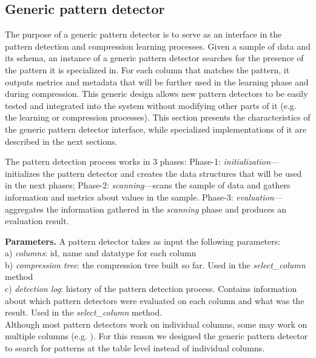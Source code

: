 \subsection{Generic pattern detector}
\label{subsec:genericpd}





% 

The purpose of a generic pattern detector is to serve as an interface in the pattern detection and compression learning processes. Given a sample of data and its schema, an instance of a generic pattern detector searches for the presence of the pattern it is specialized in.  For each column that matches the pattern, it outputs metrics and metadata that will be further used in the learning phase and during compression. This generic design allows new pattern detectors to be easily tested and integrated into the system without modifying other parts of it (e.g. the learning or compression processes). This section presents the characteristics of the generic pattern detector interface, while specialized implementations of it are described in the next sections.

The pattern detection process works in 3 phases: Phase-1: \textit{initialization}---initializes the pattern detector and creates the data structures that will be used in the next phases; Phase-2: \textit{scanning}---scans the sample of data and gathers information and metrics about values in the sample. Phase-3: \textit{evaluation}---aggregates the information gathered in the \textit{scanning} phase and produces an evaluation result.

\textbf{Parameters.} A pattern detector takes as input the following parameters:\\
a) \textit{columns}: id, name and datatype for each column\\
b) \textit{compression tree}: the compression tree built so far. Used in the \textit{select\_column} method\\
c) \textit{detection log}: history of the pattern detection process. Contains information about which pattern detectors were evaluated on each column and what was the result. Used in the \textit{select\_column} method.\\
Although most pattern detectors work on individual columns, some may work on multiple columns (e.g. ). For this reason we designed the generic pattern detector to search for patterns at the table level instead of individual columns.

